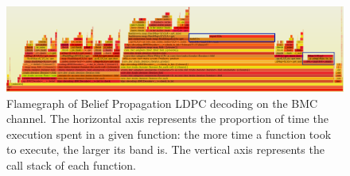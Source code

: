 \begin{figure}
    \centering
    \includegraphics[width=\textwidth]{figures/flamegraph.png}
    \caption{Flamegraph of Belief Propagation LDPC decoding on the BMC channel.
        The horizontal axis represents the proportion of time the execution
        spent in a given function: the more time a function took to execute, the
        larger its band is. The vertical axis represents the call stack of each
        function.%
    }
    \label{fig:flamegraph_gallager}
\end{figure}